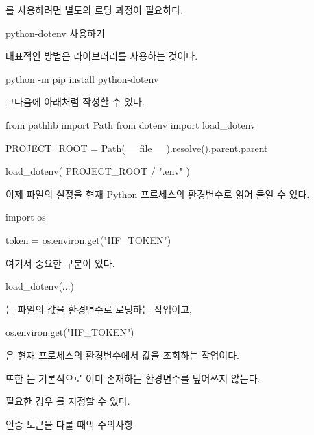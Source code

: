 를 사용하려면 별도의 로딩 과정이 필요하다.

\begin{dhknote}
\begin{dhksmry}[centered]
python-dotenv 사용하기
\end{dhksmry}
\end{dhknote}

대표적인 방법은  라이브러리를 사용하는 것이다.

\begin{dhkzsh}
python -m pip install python-dotenv
\end{dhkzsh}

그다음에 아래처럼 작성할 수 있다.

\begin{dhkcode}
from pathlib import Path
from dotenv import load_dotenv

PROJECT_ROOT = Path(__file__).resolve().parent.parent

load_dotenv(
    PROJECT_ROOT / ".env"
)
\end{dhkcode}

이제  파일의 설정을 현재 Python 프로세스의 환경변수로 읽어 들일 수 있다.

\begin{dhkcode}
import os

token = os.environ.get("HF_TOKEN")
\end{dhkcode}

여기서 중요한 구분이 있다.

\begin{dhkcode}
load_dotenv(...)
\end{dhkcode}

는  파일의 값을 환경변수로 로딩하는 작업이고,

\begin{dhkcode}
os.environ.get("HF_TOKEN")
\end{dhkcode}

은 현재 프로세스의 환경변수에서 값을 조회하는 작업이다.

또한 는 기본적으로 이미 존재하는 환경변수를 덮어쓰지 않는다.

필요한 경우 를 지정할 수 있다.

\begin{dhknote}
\begin{dhksmry}[centered]
인증 토큰을 다룰 때의 주의사항
\end{dhksmry}
\end{dhknote}

